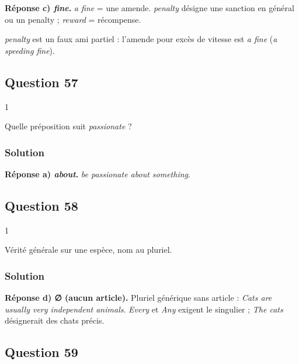 \documentclass[11pt,a4paper]{article}
\begin{document}
\textbf{Réponse c) \emph{fine}.} \emph{a fine} = une amende. \emph{penalty} désigne une sanction en général ou un penalty ; \emph{reward} = récompense.

\begin{piege}

\emph{penalty} est un faux ami partiel : l'amende pour excès de vitesse est \emph{a fine} (\emph{a speeding fine}).

\end{piege}

\hypertarget{question-57}{%
\subsection{Question 57}\label{question-57}}

\begin{indication}{1}

Quelle préposition suit \emph{passionate} ?

\end{indication}

\hypertarget{solution-56}{%
\subsubsection{Solution}\label{solution-56}}

\textbf{Réponse a) \emph{about}.} \emph{be passionate about something}.

\hypertarget{question-58}{%
\subsection{Question 58}\label{question-58}}

\begin{indication}{1}

Vérité générale sur une espèce, nom au pluriel.

\end{indication}

\hypertarget{solution-57}{%
\subsubsection{Solution}\label{solution-57}}

\textbf{Réponse d) ∅ (aucun article).} Pluriel générique sans article : \emph{Cats are usually very independent animals}. \emph{Every} et \emph{Any} exigent le singulier ; \emph{The cats} désignerait des chats précis.

\hypertarget{question-59}{%
\subsection{Question 59}\label{question-59}}
\end{document}
